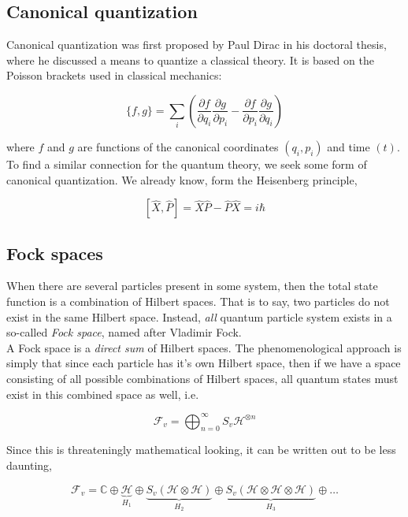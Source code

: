 \documentclass[10pt]{report}
\begin{document}
	\subsection{Canonical quantization}
	Canonical quantization was first proposed by Paul Dirac in his doctoral thesis, where he discussed a means to quantize a classical theory. It is based on the Poisson brackets used in classical mechanics:
	
	\begin{equation}
		\{f,g\} = \sum_{i} \left( \frac{\partial f}{\partial q_i}\frac{\partial g}{\partial p_i} - \frac{\partial f}{\partial p_i}\frac{\partial g}{\partial q_i} \right)
	\end{equation}
	
	where $f$ and $g$ are functions of the canonical coordinates $(q_i,p_i)$ and time $(t)$. To find a similar connection for the quantum theory, we seek some form of canonical quantization. We already know, form the Heisenberg principle,
	
	\begin{equation}
		\left[\hat{X},\hat{P}\right] = \hat{X}\hat{P} - \hat{P}\hat{X} = i\hbar
	\end{equation}
	
	\subsection{Fock spaces}
	When there are several particles present in some system, then the total state function is a combination of Hilbert spaces. That is to say, two particles do not exist in the same Hilbert space. Instead, \emph{all} quantum particle system exists in a so-called \emph{Fock space}, named after Vladimir Fock.\\
	A Fock space is a \emph{direct sum} of Hilbert spaces. The phenomenological approach is simply that since each particle has it's own Hilbert space, then if we have a space consisting of all possible combinations of Hilbert spaces, all quantum states must exist in this combined space as well, i.e.
	
	\begin{equation}
		\mathcal{F}_v = \bigoplus_{n=0}^\infty S_v \mathcal{H}^{\otimes n}
	\end{equation}
	
	Since this is threateningly mathematical looking, it can be written out to be less daunting,
	
	\begin{equation}
		\mathcal{F}_v = \mathds{C}\oplus \underbrace{\mathcal{H}}_{H_1} \oplus \underbrace{S_v(\mathcal{H}\otimes \mathcal{H})}_{H_2} \oplus \underbrace{S_v(\mathcal{H}\otimes \mathcal{H}\otimes \mathcal{H})}_{H_3} \oplus \ldots
	\end{equation}
	
\end{document}
